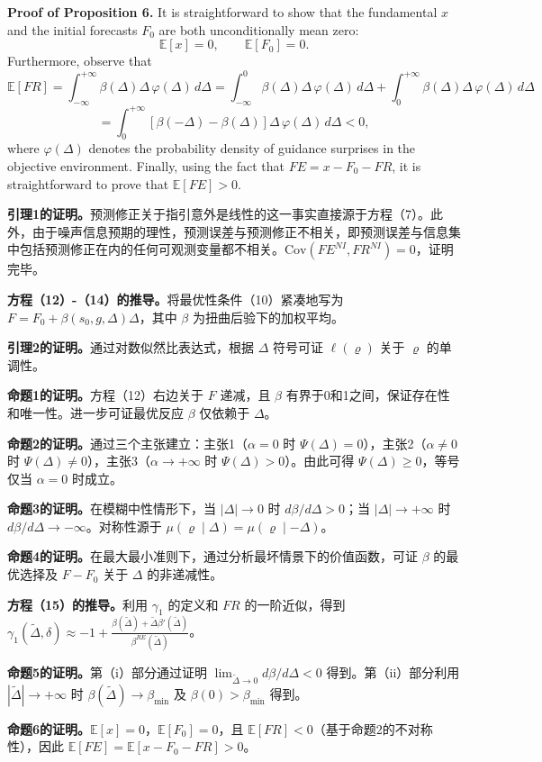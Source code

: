 \documentclass[12pt,a4paper]{article}
\newenvironment{original}
  {\par\medskip\noindent\ignorespaces}
  {\par\medskip}
\newenvironment{translation}
  {\par\noindent{\color{transblue}\ignorespaces}}
  {\par\bigskip}
\begin{document}
\begin{original}
\textbf{Proof of Proposition 6.} It is straightforward to show that the fundamental $x$ and the initial forecasts $F_0$ are both unconditionally mean zero:
\[
\mathbb{E}[x] = 0, \qquad \mathbb{E}[F_0] = 0.
\]
Furthermore, observe that
\[
\mathbb{E}[FR] = \int_{-\infty}^{+\infty} \beta(\Delta) \Delta \, \varphi(\Delta) \, d\Delta = \int_{-\infty}^{0} \beta(\Delta) \Delta \, \varphi(\Delta) \, d\Delta + \int_{0}^{+\infty} \beta(\Delta) \Delta \, \varphi(\Delta) \, d\Delta
\]
\[
= \int_{0}^{+\infty} [\beta(-\Delta) - \beta(\Delta)] \Delta \, \varphi(\Delta) \, d\Delta < 0,
\]
where $\varphi(\Delta)$ denotes the probability density of guidance surprises in the objective environment. Finally, using the fact that $FE = x - F_0 - FR$, it is straightforward to prove that $\mathbb{E}[FE] > 0$.
\end{original}

\begin{translation}
\textbf{引理1的证明。}预测修正关于指引意外是线性的这一事实直接源于方程（7）。此外，由于噪声信息预期的理性，预测误差与预测修正不相关，即预测误差与信息集中包括预测修正在内的任何可观测变量都不相关。$\text{Cov}(FE^{NI}, FR^{NI}) = 0$，证明完毕。

\textbf{方程（12）-（14）的推导。}将最优性条件（10）紧凑地写为 $F = F_0 + \beta(s_0, g, \Delta) \Delta$，其中 $\beta$ 为扭曲后验下的加权平均。

\textbf{引理2的证明。}通过对数似然比表达式，根据 $\Delta$ 符号可证 $\ell(\varrho)$ 关于 $\varrho$ 的单调性。

\textbf{命题1的证明。}方程（12）右边关于 $F$ 递减，且 $\beta$ 有界于0和1之间，保证存在性和唯一性。进一步可证最优反应 $\beta$ 仅依赖于 $\Delta$。

\textbf{命题2的证明。}通过三个主张建立：主张1（$\alpha = 0$ 时 $\Psi(\Delta) = 0$），主张2（$\alpha \neq 0$ 时 $\Psi(\Delta) \neq 0$），主张3（$\alpha \to +\infty$ 时 $\Psi(\Delta) > 0$）。由此可得 $\Psi(\Delta) \geq 0$，等号仅当 $\alpha = 0$ 时成立。

\textbf{命题3的证明。}在模糊中性情形下，当 $|\Delta| \to 0$ 时 $d\beta/d\Delta > 0$；当 $|\Delta| \to +\infty$ 时 $d\beta/d\Delta \to -\infty$。对称性源于 $\mu(\varrho \mid \Delta) = \mu(\varrho \mid -\Delta)$。

\textbf{命题4的证明。}在最大最小准则下，通过分析最坏情景下的价值函数，可证 $\beta$ 的最优选择及 $F - F_0$ 关于 $\Delta$ 的非递减性。

\textbf{方程（15）的推导。}利用 $\gamma_1$ 的定义和 $FR$ 的一阶近似，得到 $\gamma_1(\tilde{\Delta}, \delta) \approx -1 + \frac{\beta(\tilde{\Delta}) + \tilde{\Delta} \beta'(\tilde{\Delta})}{\beta^{RE}(\tilde{\Delta})}$。

\textbf{命题5的证明。}第（i）部分通过证明 $\lim_{\tilde{\Delta} \to 0} d\beta/d\Delta < 0$ 得到。第（ii）部分利用 $|\tilde{\Delta}| \to +\infty$ 时 $\beta(\tilde{\Delta}) \to \beta_{\min}$ 及 $\beta(0) > \beta_{\min}$ 得到。

\textbf{命题6的证明。}$\mathbb{E}[x] = 0$，$\mathbb{E}[F_0] = 0$，且 $\mathbb{E}[FR] < 0$（基于命题2的不对称性），因此 $\mathbb{E}[FE] = \mathbb{E}[x - F_0 - FR] > 0$。
\end{translation}
\end{document}
